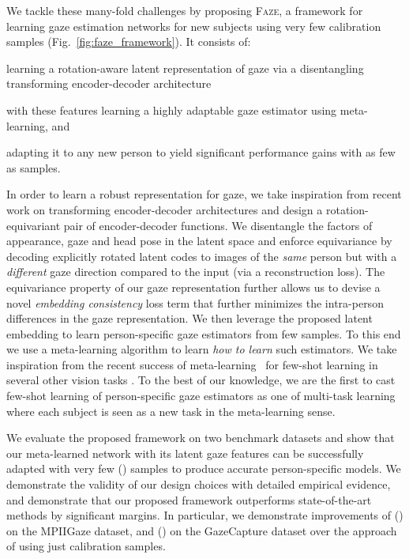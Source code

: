 \documentclass[10pt,twocolumn,letterpaper]{article}
\newcommand{\faze}[0]{\textsc{Faze}\xspace}
\begin{document}
We tackle these many-fold challenges by proposing \faze, a framework for learning gaze estimation networks for new subjects using very few calibration samples (Fig.~\ref{fig:faze_framework}).
It consists of:
\begin{inparaenum}[i)]
\item learning a rotation-aware latent representation of gaze via a disentangling transforming encoder-decoder architecture 
\item with these features learning a highly adaptable gaze estimator using meta-learning, and 
\item adapting it to any new person to yield significant performance gains with as few as  samples.
\end{inparaenum}


In order to learn a robust representation for gaze, we take inspiration from recent work on transforming encoder-decoder architectures \cite{Hinton2011ICANN,Worrall2017ICCV} and design a rotation-equivariant pair of encoder-decoder functions. 
We disentangle the factors of appearance, gaze and head pose in the latent space and enforce equivariance by decoding explicitly rotated latent codes to images of the \emph{same} person but with a \emph{different} gaze direction compared to the input (via a  reconstruction loss).
The equivariance property of our gaze representation further allows us to devise a novel \emph{embedding consistency} loss term that further minimizes the intra-person differences in the gaze representation. 
We then leverage the proposed latent embedding to learn person-specific gaze estimators from few samples. To this end we use a meta-learning algorithm to learn \emph{how to learn} such estimators. We take inspiration from the recent success of meta-learning~\cite{andrychowicz2016learning} for few-shot learning in several other vision tasks \cite{Finn2017ICML, gui2018few, park2018meta}. To the best of our knowledge, we are the first to cast few-shot learning of person-specific gaze estimators as one of  multi-task learning where each subject is seen as a new task in the meta-learning sense.

We evaluate the proposed framework on two benchmark datasets and show that our meta-learned network with its latent gaze features can be successfully adapted with very few () samples to produce accurate person-specific models. We demonstrate the validity of our design choices with detailed empirical evidence, and demonstrate that our proposed framework outperforms state-of-the-art methods by significant margins.   
In particular, we demonstrate improvements of  () on the MPIIGaze dataset, and  () on the GazeCapture dataset over the approach of \cite{Liu2018BMVC} using just  calibration samples.
\end{document}
